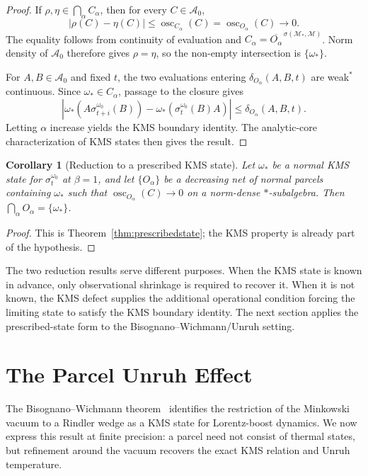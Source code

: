 \documentclass[11pt]{article}
\newtheorem{corollary}[theorem]{Corollary}
\begin{document}
\begin{proof}
If $\rho,\eta\in\bigcap_\alpha C_\alpha$, then for every
$C\in\mathcal A_0$,
\[
|\rho(C)-\eta(C)|
\leq
\operatorname{osc}_{C_\alpha}(C)
=
\operatorname{osc}_{O_\alpha}(C)
\longrightarrow0.
\]
The equality follows from continuity of evaluation and
$C_\alpha=\overline{O_\alpha}^{\,\sigma(\mathcal M_*,\mathcal M)}$.
Norm density of $\mathcal A_0$ therefore gives $\rho=\eta$, so the
non-empty intersection is $\{\omega_*\}$.

For $A,B\in\mathcal A_0$ and fixed $t$, the two evaluations entering
$\delta_{O_\alpha}(A,B,t)$ are weak$^*$ continuous. Since
$\omega_*\in C_\alpha$, passage to the closure gives
\[
\left|
\omega_*(A\sigma_{t+i}^{\omega_0}(B))
-
\omega_*(\sigma_t^{\omega_0}(B)A)
\right|
\leq\delta_{O_\alpha}(A,B,t).
\]
Letting $\alpha$ increase yields the KMS boundary identity. The
analytic-core characterization of KMS states
\cite[Prop.~5.3.7]{brattelirobinson2} then gives the result.
\end{proof}

\begin{corollary}[Reduction to a prescribed KMS state]
\label{thm:kms_prescribed}
Let $\omega_*$ be a normal KMS state for
$\sigma_t^{\omega_0}$ at $\beta=1$, and let $\{O_\alpha\}$ be a decreasing net of normal parcels containing
$\omega_*$ such that
$\operatorname{osc}_{O_\alpha}(C)\to0$ on a norm-dense $*$-subalgebra.
Then $\bigcap_\alpha O_\alpha=\{\omega_*\}$.
\end{corollary}

\begin{proof}
This is Theorem~\ref{thm:prescribedstate}; the KMS property is already
part of the hypothesis.
\end{proof}

The two reduction results serve different purposes. When the KMS state is
known in advance, only observational shrinkage is required to recover it.
When it is not known, the KMS defect supplies the additional operational
condition forcing the limiting state to satisfy the KMS boundary
identity. The next section applies the prescribed-state form to the
Bisognano--Wichmann/Unruh setting.
\section{The Parcel Unruh Effect}
\label{sec:unruh}

The Bisognano--Wichmann theorem~\cite{bisognanowichmann76} identifies the
restriction of the Minkowski vacuum to a Rindler wedge as a KMS state for
Lorentz-boost dynamics. We now express this result at finite precision:
a parcel need not consist of thermal states, but refinement around the
vacuum recovers the exact KMS relation and Unruh temperature.
\end{document}
